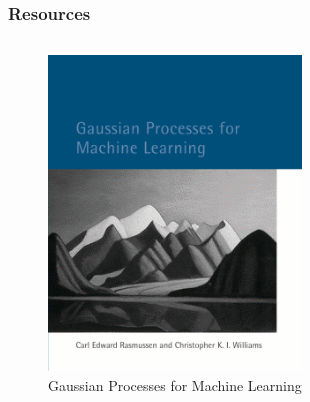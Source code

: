 \documentclass[10pt]{beamer}
\begin{document}
  \begin{frame}
    \frametitle{Resources}

    \begin{columns}
      \begin{column}{0.5\textwidth}
        \begin{figure}
          \centering
          \includegraphics[width=0.6\textwidth]{gpml.png}
          \caption*{Gaussian Processes for Machine Learning \footnotemark[1]}
        \end{figure}
      \end{column}
\end{columns}
\end{frame}
\end{document}
